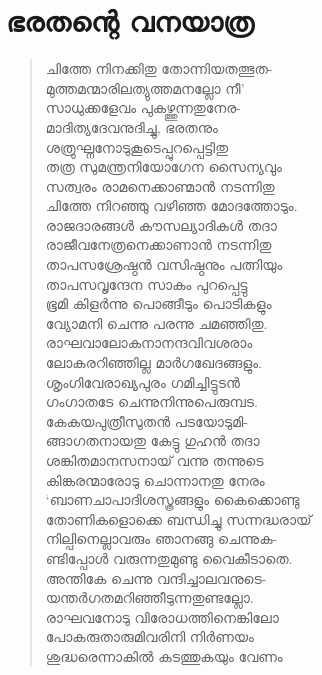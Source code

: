 
\section{ഭരതന്റെ വനയാത്ര}

\begin{verse}
ചിത്തേ നിനക്കിതു തോന്നിയതത്ഭുത-\\
മുത്തമന്മാരിലത്യുത്തമനല്ലോ നീ’\\
സാധുക്കളേവം പുകഴ്ത്തുന്നതുനേര-\\
മാദിത്യദേവനുദിച്ചു, ഭരതനും\\
ശത്രുഘ്നനോടുകൂടെപ്പുറപ്പെട്ടിതു\\
തത്ര സുമന്ത്രനിയോഗേന സൈന്യവും\\
സത്വരം രാമനെക്കാണ്മാന്‍ നടന്നിതു\\
ചിത്തേ നിറഞ്ഞു വഴിഞ്ഞ മോദത്തോടും.\\
രാജദാരങ്ങള്‍ കൗസല്യാദികള്‍ തദാ\\
രാജീവനേത്രനെക്കാണാന്‍ നടന്നിതു\\
താപസശ്രേഷ്ഠന്‍ വസിഷ്ഠനും പത്നിയും\\
താപസവൃന്ദേന സാകം പുറപ്പെട്ടു\\
ഭൂമി കിളര്‍ന്നു പൊങ്ങീടും പൊടികളും\\
വ്യോമനി ചെന്നു പരന്നു ചമഞ്ഞിതു.\\
രാഘവാലോകനാനന്ദവിവശരാം\\
ലോകരറിഞ്ഞില്ല മാര്‍ഗഖേദങ്ങളും.\\
ശൃംഗിവേരാഖ്യപുരം ഗമിച്ചിട്ടുടന്‍\\
ഗംഗാതടേ ചെന്നുനിന്നുപെരുമ്പട.\\
കേകയപുത്രീസുതന്‍ പടയോടുമി-\\
ങ്ങാഗതനായതു കേട്ടു ഗുഹന്‍ തദാ\\
ശങ്കിതമാനസനായ് വന്നു തന്നുടെ\\
കിങ്കരന്മാരോടു ചൊന്നാനതു നേരം\\
‘ബാണചാപാദിശസ്ത്രങ്ങളും കൈക്കൊണ്ടു\\
തോണികളൊക്കെ ബന്ധിച്ചു സന്നദ്ധരായ്\\
നില്പിനെല്ലാവരും ഞാനങ്ങു ചെന്നുക-\\
ണ്ടിപ്പോള്‍ വരുന്നതുമുണ്ടു വൈകീടാതെ.\\
അന്തികേ ചെന്നു വന്ദിച്ചാലവനുടെ-\\
യന്തര്‍ഗതമറിഞ്ഞീടുന്നതുണ്ടല്ലോ.\\
രാഘവനോടു വിരോധത്തിനെങ്കിലോ\\
പോകരുതാരുമിവരിനി നിര്‍ണയം\\
ശുദ്ധരെന്നാകില്‍ കടത്തുകയും വേണം\\

\end{verse}
